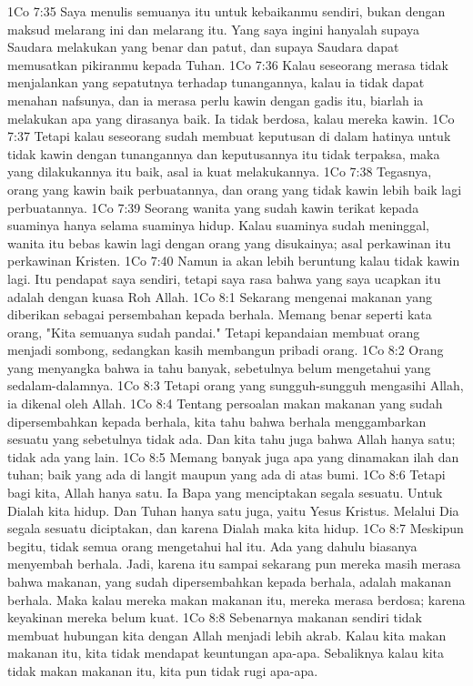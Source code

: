1Co 7:35  Saya menulis semuanya itu untuk kebaikanmu sendiri, bukan dengan maksud melarang ini dan melarang itu. Yang saya ingini hanyalah supaya Saudara melakukan yang benar dan patut, dan supaya Saudara dapat memusatkan pikiranmu kepada Tuhan.
1Co 7:36  Kalau seseorang merasa tidak menjalankan yang sepatutnya terhadap tunangannya, kalau ia tidak dapat menahan nafsunya, dan ia merasa perlu kawin dengan gadis itu, biarlah ia melakukan apa yang dirasanya baik. Ia tidak berdosa, kalau mereka kawin.
1Co 7:37  Tetapi kalau seseorang sudah membuat keputusan di dalam hatinya untuk tidak kawin dengan tunangannya dan keputusannya itu tidak terpaksa, maka yang dilakukannya itu baik, asal ia kuat melakukannya.
1Co 7:38  Tegasnya, orang yang kawin baik perbuatannya, dan orang yang tidak kawin lebih baik lagi perbuatannya.
1Co 7:39  Seorang wanita yang sudah kawin terikat kepada suaminya hanya selama suaminya hidup. Kalau suaminya sudah meninggal, wanita itu bebas kawin lagi dengan orang yang disukainya; asal perkawinan itu perkawinan Kristen.
1Co 7:40  Namun ia akan lebih beruntung kalau tidak kawin lagi. Itu pendapat saya sendiri, tetapi saya rasa bahwa yang saya ucapkan itu adalah dengan kuasa Roh Allah.
1Co 8:1  Sekarang mengenai makanan yang diberikan sebagai persembahan kepada berhala. Memang benar seperti kata orang, "Kita semuanya sudah pandai." Tetapi kepandaian membuat orang menjadi sombong, sedangkan kasih membangun pribadi orang.
1Co 8:2  Orang yang menyangka bahwa ia tahu banyak, sebetulnya belum mengetahui yang sedalam-dalamnya.
1Co 8:3  Tetapi orang yang sungguh-sungguh mengasihi Allah, ia dikenal oleh Allah.
1Co 8:4  Tentang persoalan makan makanan yang sudah dipersembahkan kepada berhala, kita tahu bahwa berhala menggambarkan sesuatu yang sebetulnya tidak ada. Dan kita tahu juga bahwa Allah hanya satu; tidak ada yang lain.
1Co 8:5  Memang banyak juga apa yang dinamakan ilah dan tuhan; baik yang ada di langit maupun yang ada di atas bumi.
1Co 8:6  Tetapi bagi kita, Allah hanya satu. Ia Bapa yang menciptakan segala sesuatu. Untuk Dialah kita hidup. Dan Tuhan hanya satu juga, yaitu Yesus Kristus. Melalui Dia segala sesuatu diciptakan, dan karena Dialah maka kita hidup.
1Co 8:7  Meskipun begitu, tidak semua orang mengetahui hal itu. Ada yang dahulu biasanya menyembah berhala. Jadi, karena itu sampai sekarang pun mereka masih merasa bahwa makanan, yang sudah dipersembahkan kepada berhala, adalah makanan berhala. Maka kalau mereka makan makanan itu, mereka merasa berdosa; karena keyakinan mereka belum kuat.
1Co 8:8  Sebenarnya makanan sendiri tidak membuat hubungan kita dengan Allah menjadi lebih akrab. Kalau kita makan makanan itu, kita tidak mendapat keuntungan apa-apa. Sebaliknya kalau kita tidak makan makanan itu, kita pun tidak rugi apa-apa.
